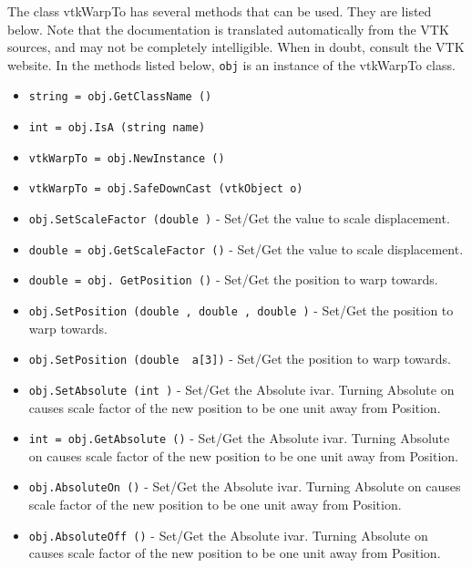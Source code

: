 The class vtkWarpTo has several methods that can be used.
  They are listed below.
Note that the documentation is translated automatically from the VTK sources,
and may not be completely intelligible.  When in doubt, consult the VTK website.
In the methods listed below, \verb|obj| is an instance of the vtkWarpTo class.
\begin{itemize}
\item  \verb|string = obj.GetClassName ()|

\item  \verb|int = obj.IsA (string name)|

\item  \verb|vtkWarpTo = obj.NewInstance ()|

\item  \verb|vtkWarpTo = obj.SafeDownCast (vtkObject o)|

\item  \verb|obj.SetScaleFactor (double )| -  Set/Get the value to scale displacement.

\item  \verb|double = obj.GetScaleFactor ()| -  Set/Get the value to scale displacement.

\item  \verb|double = obj. GetPosition ()| -  Set/Get the position to warp towards.

\item  \verb|obj.SetPosition (double , double , double )| -  Set/Get the position to warp towards.

\item  \verb|obj.SetPosition (double  a[3])| -  Set/Get the position to warp towards.

\item  \verb|obj.SetAbsolute (int )| -  Set/Get the Absolute ivar. Turning Absolute on causes scale factor
 of the new position to be one unit away from Position.

\item  \verb|int = obj.GetAbsolute ()| -  Set/Get the Absolute ivar. Turning Absolute on causes scale factor
 of the new position to be one unit away from Position.

\item  \verb|obj.AbsoluteOn ()| -  Set/Get the Absolute ivar. Turning Absolute on causes scale factor
 of the new position to be one unit away from Position.

\item  \verb|obj.AbsoluteOff ()| -  Set/Get the Absolute ivar. Turning Absolute on causes scale factor
 of the new position to be one unit away from Position.

\end{itemize}
